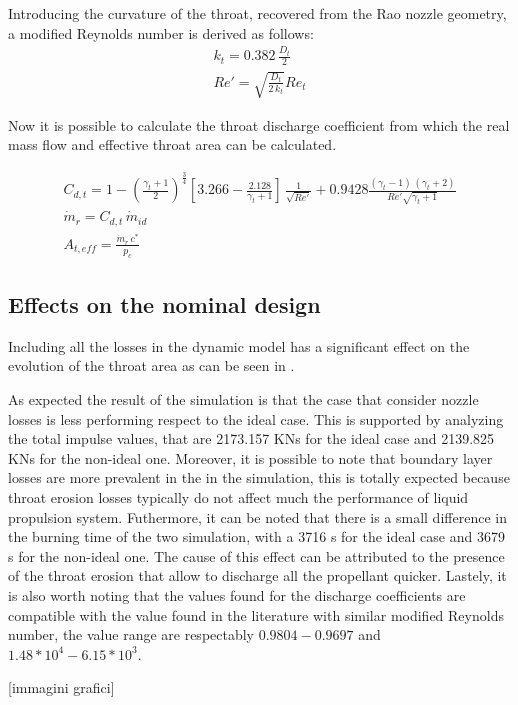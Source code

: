 \begin{itemize}
    Introducing the curvature of the throat, recovered from the Rao nozzle geometry, a modified Reynolds number is derived as follows:
    \begin{gather}
        k_t = 0.382 \, \frac{D_t}{2} \\
        Re'=\sqrt{\frac{D_t}{2 \, k_t}}Re_t
    \end{gather}  

    Now it is possible to calculate the throat discharge coefficient from which the real mass flow and effective throat area can be calculated.  

    \begin{gather}
        C_{d,t} = 1 - \left( \frac{\gamma_t+1}{2} \right)^{\frac{3}{4}}
        \left[3.266 - \frac{2.128}{\gamma_t+1} \right] \, \frac{1}{\sqrt{Re'}} + 0.9428 \frac{(\gamma_t - 1) \, (\gamma_t + 2)}{Re' \sqrt{\gamma_t + 1}} \\
        \dot{m}_r = C_{d,t} \, \dot{m}_{id} \\
        A_{t,eff} = \frac{\dot{m}_r \, c^*}{p_c}
    \end{gather}
\end{itemize}

\subsection{Effects on the nominal design}  

Including all the losses in the dynamic model has a significant effect on the evolution of the throat area as can be seen in \mref.


As expected the result of the simulation is that the case that consider nozzle losses is less performing respect to the ideal case. This is supported by analyzing the total impulse values, that are 2173.157 KNs for the ideal case and 2139.825 KNs for the non-ideal one. Moreover, it is possible to note that boundary layer losses are more prevalent in the in the simulation, this is totally expected because throat erosion losses typically do not affect much the performance of liquid propulsion system.  Futhermore, it can be noted that there is a small difference in the burning time of the two simulation, with a 3716 s for the ideal case and 3679 s for the non-ideal one. The cause of this effect can be attributed to the presence of the throat erosion that allow to discharge all the propellant quicker. Lastely, it is also worth noting that the values found for the discharge coefficients are compatible with the value found in the literature with similar modified Reynolds number, the value range are respectably $0.9804-0.9697$ and $1.48*10^4-6.15*10^3$.    

[immagini grafici]